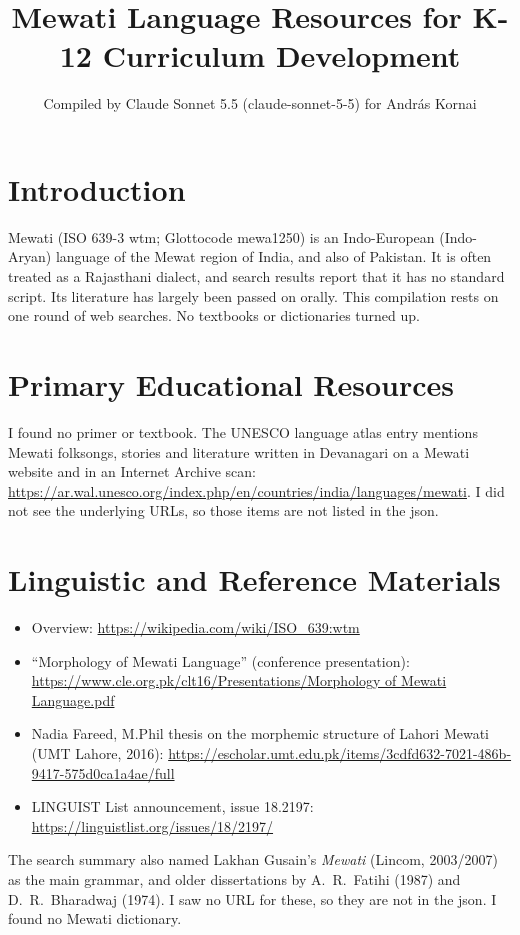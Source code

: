 \documentclass[12pt]{article}
\title{Mewati Language Resources for K-12 Curriculum Development}
\author{Compiled by Claude Sonnet 5.5 (claude-sonnet-5-5) for Andr\'as Kornai}
\date{}
\begin{document}
\maketitle

\section{Introduction}
Mewati (ISO 639-3 wtm; Glottocode mewa1250) is an Indo-European (Indo-Aryan) language of the Mewat region of India, and also of Pakistan. It is often treated as a Rajasthani dialect, and search results report that it has no standard script. Its literature has largely been passed on orally. This compilation rests on one round of web searches. No textbooks or dictionaries turned up.

\section{Primary Educational Resources}
I found no primer or textbook. The UNESCO language atlas entry mentions Mewati folksongs, stories and literature written in Devanagari on a Mewati website and in an Internet Archive scan: \url{https://ar.wal.unesco.org/index.php/en/countries/india/languages/mewati}. I did not see the underlying URLs, so those items are not listed in the json.

\section{Linguistic and Reference Materials}
\begin{itemize}
\item Overview: \url{https://wikipedia.com/wiki/ISO_639:wtm}
\item ``Morphology of Mewati Language'' (conference presentation): \url{https://www.cle.org.pk/clt16/Presentations/Morphology of Mewati Language.pdf}
\item Nadia Fareed, M.Phil thesis on the morphemic structure of Lahori Mewati (UMT Lahore, 2016): \url{https://escholar.umt.edu.pk/items/3cdfd632-7021-486b-9417-575d0ca1a4ae/full}
\item LINGUIST List announcement, issue 18.2197: \url{https://linguistlist.org/issues/18/2197/}
\end{itemize}
The search summary also named Lakhan Gusain's \emph{Mewati} (Lincom, 2003/2007) as the main grammar, and older dissertations by A.\ R.\ Fatihi (1987) and D.\ R.\ Bharadwaj (1974). I saw no URL for these, so they are not in the json. I found no Mewati dictionary.
\end{document}

